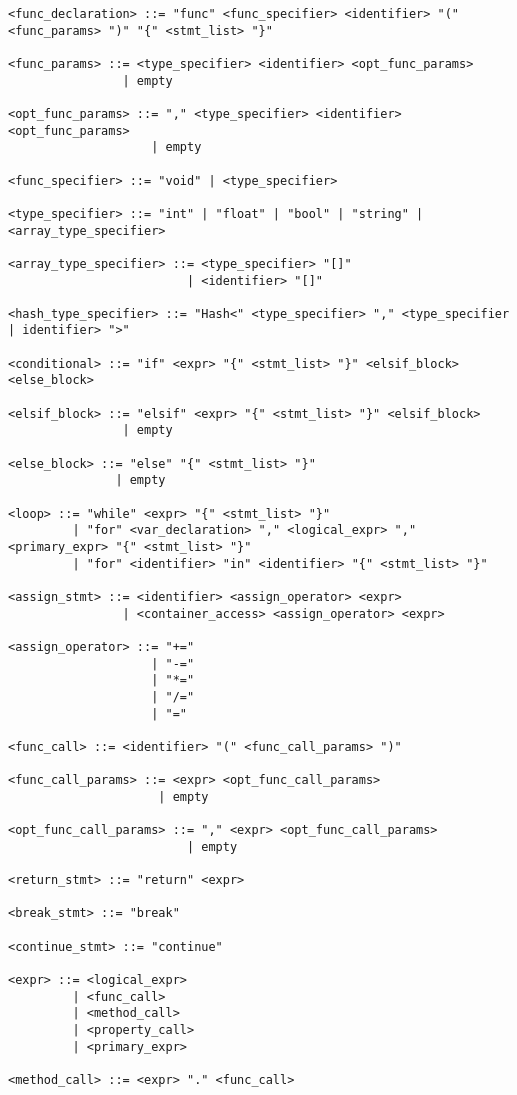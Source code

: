 \documentclass{TDP003mall}
\begin{document}
\begin{verbatim}
<func_declaration> ::= "func" <func_specifier> <identifier> "(" <func_params> ")" "{" <stmt_list> "}"

<func_params> ::= <type_specifier> <identifier> <opt_func_params>
                | empty

<opt_func_params> ::= "," <type_specifier> <identifier> <opt_func_params>
                    | empty

<func_specifier> ::= "void" | <type_specifier>

<type_specifier> ::= "int" | "float" | "bool" | "string" | <array_type_specifier>

<array_type_specifier> ::= <type_specifier> "[]"
                         | <identifier> "[]"

<hash_type_specifier> ::= "Hash<" <type_specifier> "," <type_specifier | identifier> ">"

<conditional> ::= "if" <expr> "{" <stmt_list> "}" <elsif_block> <else_block>

<elsif_block> ::= "elsif" <expr> "{" <stmt_list> "}" <elsif_block>
                | empty

<else_block> ::= "else" "{" <stmt_list> "}"
               | empty

<loop> ::= "while" <expr> "{" <stmt_list> "}"
         | "for" <var_declaration> "," <logical_expr> "," <primary_expr> "{" <stmt_list> "}"
         | "for" <identifier> "in" <identifier> "{" <stmt_list> "}"

<assign_stmt> ::= <identifier> <assign_operator> <expr>
                | <container_access> <assign_operator> <expr>

<assign_operator> ::= "+="
                    | "-="
                    | "*="
                    | "/="
                    | "="

<func_call> ::= <identifier> "(" <func_call_params> ")"

<func_call_params> ::= <expr> <opt_func_call_params>
                     | empty

<opt_func_call_params> ::= "," <expr> <opt_func_call_params>
                         | empty

<return_stmt> ::= "return" <expr>

<break_stmt> ::= "break"

<continue_stmt> ::= "continue"

<expr> ::= <logical_expr> 
         | <func_call>
         | <method_call>
         | <property_call>
         | <primary_expr>

<method_call> ::= <expr> "." <func_call>


\end{verbatim}
\end{document}
